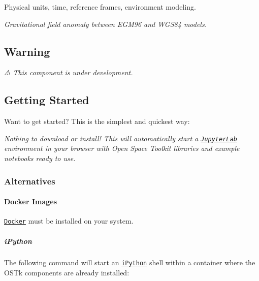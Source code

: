 \href{https://travis-ci.com/open-space-collective/open-space-toolkit-physics}{\tt } \href{https://codecov.io/gh/open-space-collective/open-space-toolkit-physics}{\tt } \href{https://open-space-collective.github.io/open-space-toolkit-physics}{\tt } \href{https://badge.fury.io/gh/open-space-collective%2Fopen-space-toolkit-physics}{\tt } \href{https://badge.fury.io/py/open-space-toolkit-physics}{\tt } \href{https://opensource.org/licenses/Apache-2.0}{\tt }

Physical units, time, reference frames, environment modeling.



{\itshape Gravitational field anomaly between E\+G\+M96 and W\+G\+S84 models.}

\subsection*{Warning}

{\itshape ⚠ This component is under development.}

\subsection*{Getting Started}

Want to get started? This is the simplest and quickest way\+:

\href{https://mybinder.org/v2/gh/open-space-collective/open-space-toolkit/master?urlpath=lab/tree/notebooks}{\tt }

{\itshape Nothing to download or install! This will automatically start a \href{https://jupyterlab.readthedocs.io/en/stable/}{\tt Jupyter\+Lab} environment in your browser with Open Space Toolkit libraries and example notebooks ready to use.}

\subsubsection*{Alternatives}

\paragraph*{Docker Images}

\href{https://www.docker.com/}{\tt Docker} must be installed on your system.

\subparagraph*{i\+Python}

The following command will start an \href{https://ipython.org/}{\tt i\+Python} shell within a container where the O\+S\+Tk components are already installed\+:


